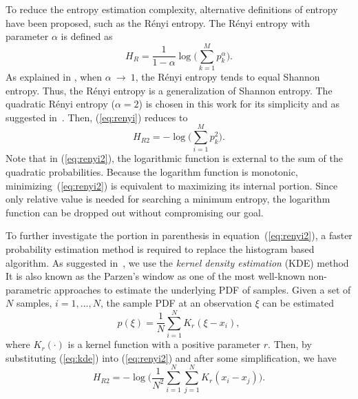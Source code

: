 \documentclass[journal,comsoc, onecolumn, 12pt,draftclsnofoot]{IEEEtran} %
\begin{document}
To reduce the entropy estimation complexity, alternative definitions of entropy have been proposed, such as the R\'enyi entropy.
The R\'enyi entropy  with parameter \(\alpha\) is defined as \cite{renyi1961measures}
\begin{equation}
H_{R }={\frac {1}{1-\alpha }}\log {\Bigg (}\sum _{k=1}^{M}p_{k}^{\alpha }{\Bigg )}.
\label{eq:renyi}
\end{equation}
As explained in \cite{Bromiley2004}, when $\alpha~\to~1$, the R\'enyi entropy tends to equal Shannon entropy.
Thus, the R\'enyi entropy is a generalization of Shannon entropy.
The quadratic R\'enyi entropy ($\alpha=2$) is chosen in this work for its simplicity and as suggested in~\cite{Santamaria2002}.
Then, (\ref{eq:renyi}) reduces to
\begin{equation}
H_{R2 }=-\log {\Bigg (}\sum _{i=1}^{M}p_{k}^{2 }{\Bigg )}.
\label{eq:renyi2}
\end{equation}
Note that in (\ref{eq:renyi2}), the logarithmic function is  external to the sum of the quadratic probabilities.
Because the logarithm function is monotonic, minimizing~(\ref{eq:renyi2}) is equivalent to maximizing its internal portion.
Since only relative value is needed for searching a minimum entropy, the logarithm function can be dropped out without compromising our goal.
% 
% 

To further investigate the portion in parenthesis in equation~(\ref{eq:renyi2}), a faster probability estimation method is required to replace the histogram based algorithm.
As suggested in~\cite{Principe2000a}, we use the \textit{kernel density estimation} (KDE) method
It is also known as the Parzen's window \cite{Parzen1962} as one of the most well-known non-parametric approaches to estimate the underlying PDF of samples. 
% 
% 
Given a set of \(N\) samples, \(i=1, \dots, N\), the sample PDF at an observation \(\xi\) can be estimated 
\begin{equation}
{ p(\xi)={\frac {1}{N}}\sum _{i=1}^{N}K_{r}\left(\xi-x_i\right)},
\label{eq:kde}
\end{equation}
where $K_r(\cdot)$ is a kernel function with a positive parameter $r$.
Then, by substituting (\ref{eq:kde}) into (\ref{eq:renyi2}) and after some simplification, we have
\begin{equation}
H_{R2 }=-\log {\Bigg (}\frac{1}{N^2}\sum _{i=1}^{N}\sum _{j=1}^{N}K_{r}\left(x_i-x_j\right){\Bigg )}.
\label{eq:ker_ent_est}
\end{equation}
\end{document}
